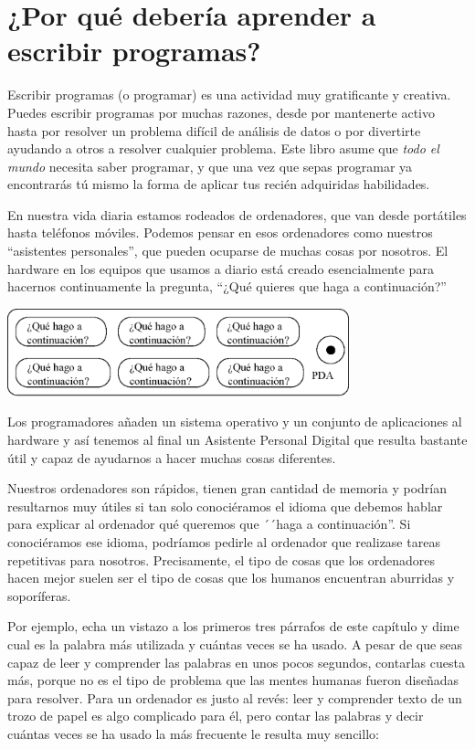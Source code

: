 
\chapter{¿Por qué debería aprender a escribir programas?}

Escribir programas (o programar) es una actividad muy
gratificante y creativa. Puedes escribir programas por
muchas razones, desde por mantenerte activo hasta
por resolver un problema difícil de análisis de datos o
por divertirte ayudando a otros a resolver cualquier problema.
Este libro asume que \emph{todo el mundo} necesita saber programar,
y que una vez que sepas programar ya encontrarás tú mismo
la forma de aplicar tus recién adquiridas habilidades.

En nuestra vida diaria estamos rodeados de ordenadores, que van
desde portátiles hasta teléfonos móviles. Podemos pensar en esos
ordenadores como nuestros ``asistentes personales'', que pueden
ocuparse de muchas cosas por nosotros. El hardware en los equipos
que usamos a diario está creado esencialmente para hacernos
continuamente la pregunta,
``¿Qué quieres que haga a continuación?''

\beforefig
\centerline{\includegraphics[height=1.00in]{figs2/pda.eps}}
\afterfig

Los programadores añaden un sistema operativo y un conjunto de
aplicaciones al hardware y así tenemos al final un Asistente Personal
Digital que resulta bastante útil y capaz de ayudarnos a hacer
muchas cosas diferentes.

Nuestros ordenadores son rápidos, tienen gran cantidad de memoria
y podrían resultarnos muy útiles si tan solo conociéramos el idioma
que debemos hablar para explicar al ordenador qué queremos que
´´haga a continuación''. Si conociéramos ese idioma, podríamos pedirle al
ordenador que realizase tareas repetitivas para nosotros. 
Precisamente, el tipo de cosas que los ordenadores hacen mejor
suelen ser el tipo de cosas que los humanos encuentran aburridas
y soporíferas.

Por ejemplo, echa un vistazo a los primeros tres párrafos de este
capítulo y dime cual es la palabra más utilizada y cuántas veces
se ha usado. A pesar de que seas capaz de leer y comprender
las palabras en unos pocos segundos, contarlas cuesta más,
porque no es el tipo de problema que las mentes humanas
fueron diseñadas para resolver. Para un ordenador
es justo al revés: leer y comprender texto
de un trozo de papel es algo complicado para él,
pero contar las palabras y decir cuántas veces
se ha usado la más frecuente le resulta muy sencillo:


